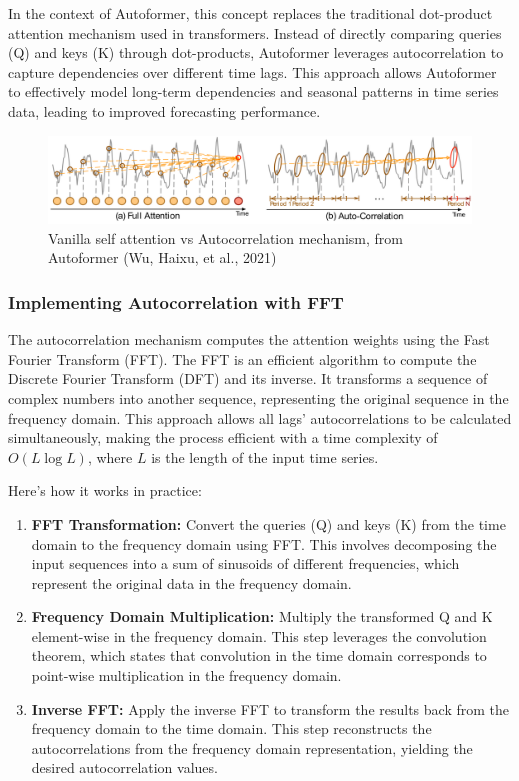 In the context of Autoformer, this concept replaces the traditional dot-product attention mechanism used in transformers. Instead of directly comparing queries (Q) and keys (K) through dot-products, Autoformer leverages autocorrelation to capture dependencies over different time lags. This approach allows Autoformer to effectively model long-term dependencies and seasonal patterns in time series data, leading to improved forecasting performance.

\begin{figure}[htbp]
    \centering
    \includegraphics[width=15cm]{3_ChapterTranformerVariants/figuras/FullAttentionAutoCorrelation.pdf}
    \caption{Vanilla self attention vs Autocorrelation mechanism, from Autoformer (Wu, Haixu, et al., 2021)\cite{wu2022autoformerdecompositiontransformersautocorrelation}}
    \end{figure}


\subsubsection{Implementing Autocorrelation with FFT}
The autocorrelation mechanism computes the attention weights using the Fast Fourier Transform (FFT). The FFT is an efficient algorithm to compute the Discrete Fourier Transform (DFT) and its inverse. It transforms a sequence of complex numbers into another sequence, representing the original sequence in the frequency domain. This approach allows all lags’ autocorrelations to be calculated simultaneously, making the process efficient with a time complexity of \( O(L \log L) \), where \( L \) is the length of the input time series.

Here’s how it works in practice:
\begin{enumerate}
    \item \textbf{FFT Transformation:} Convert the queries (Q) and keys (K) from the time domain to the frequency domain using FFT. This involves decomposing the input sequences into a sum of sinusoids of different frequencies, which represent the original data in the frequency domain.
    \item \textbf{Frequency Domain Multiplication:} Multiply the transformed Q and K element-wise in the frequency domain. This step leverages the convolution theorem, which states that convolution in the time domain corresponds to point-wise multiplication in the frequency domain.
    \item \textbf{Inverse FFT:} Apply the inverse FFT to transform the results back from the frequency domain to the time domain. This step reconstructs the autocorrelations from the frequency domain representation, yielding the desired autocorrelation values.
\end{enumerate}
    

